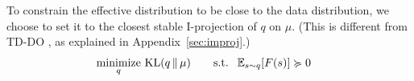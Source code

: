\begin{comment}
\citet{kolter2011fixed} achieve this by selecting $q$ that solves this optimization problem
\begin{align}
  \underset{q}{\text{minimize}}~\text{KL}(\mu||q) & \qquad \text{s.t. } ~ E_{s\sim q}[F(s)] \succcurlyeq 0 \label{eqn:kolter2011objective}
\end{align}
explicitly optimizing over the distributons using a primal-dual formulation that exploits the structure of the problem. The resultant algorithm, TD-DO, performs a first-order optimization method on a dual objective using quasi-Newton methods alongside every TD step.
\end{comment}

To constrain the effective distribution to be close to the data distribution, we choose to set it to the closest stable I-projection of $q$ on $\mu$. (This is different from TD-DO \citep{kolter2011fixed}, as explained in Appendix~\ref{sec:improj}.)
\begin{align}
  \underset{q}{\text{minimize}}~\text{KL}(q\,\|\,\mu) & \qquad \text{s.t. } ~ \mathbb{E}_{s\sim q}[F(s)] \succcurlyeq 0 \label{eqn:ouroptobj}
\end{align}

